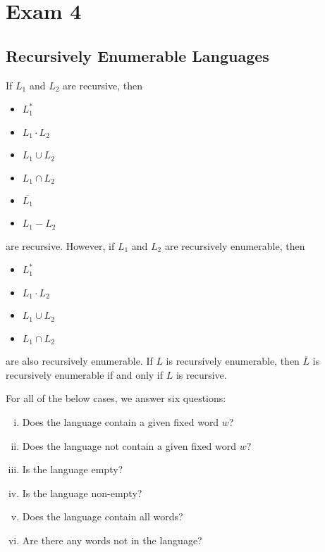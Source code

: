 \section{Exam 4}\label{sec:exam-4-cheatsheet}

\subsection{Recursively Enumerable Languages}
If \(L_1\) and \(L_2\) are recursive, then 

\begin{itemize}
    \item \(L_1^*\)
    \item \(L_1\cdot L_2\)
    \item \(L_1\cup L_2\)
    \item \(L_1\cap L_2\)
    \item \(\overline{L_1}\)
    \item \(L_1 - L_2\)
\end{itemize}

are recursive. However, if \(L_1\) and \(L_2\) are recursively enumerable, then

\begin{itemize}
    \item \(L_1^*\)
    \item \(L_1\cdot L_2\)
    \item \(L_1\cup L_2\)
    \item \(L_1\cap L_2\)
\end{itemize}

are also recursively enumerable. If \(L\) is recursively enumerable, then \(\overline{L}\) is recursively enumerable if and only if \(L\) is recursive.

For all of the below cases, we answer six questions:

\begin{enumerate}[i.]
    \item Does the language contain a given fixed word \(w\)?
    \item Does the language not contain a given fixed word \(w\)?
    \item Is the language empty?
    \item Is the language non-empty?
    \item Does the language contain all words?
    \item Are there any words not in the language?
\end{enumerate}

